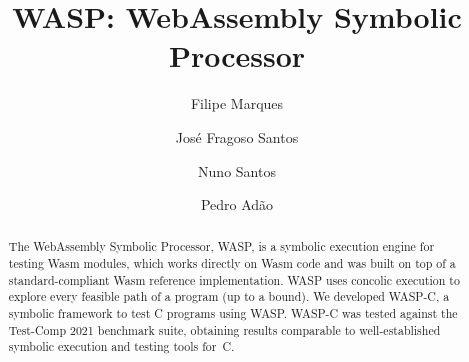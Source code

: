 \documentclass[runningheads]{llncs}
\begin{document}
%
\title{WASP: WebAssembly Symbolic Processor}
%
%
\author{
  Filipe Marques \and
  Jos\'e Fragoso Santos \and
  Nuno Santos \and
  Pedro Ad\~ao
}
%
%
%
\maketitle              %
%
\begin{abstract}
The WebAssembly Symbolic Processor, WASP, is a symbolic execution engine for testing Wasm modules, which works directly on Wasm code and was built on top of a standard-compliant Wasm reference implementation. WASP uses concolic execution to explore every feasible path of a program (up to a bound). We developed WASP-C, a symbolic framework to test C programs using WASP\@. WASP-C was tested against the Test-Comp 2021 benchmark suite, obtaining results comparable to well-established symbolic execution and testing tools for~C.
\end{abstract}





\end{document}
